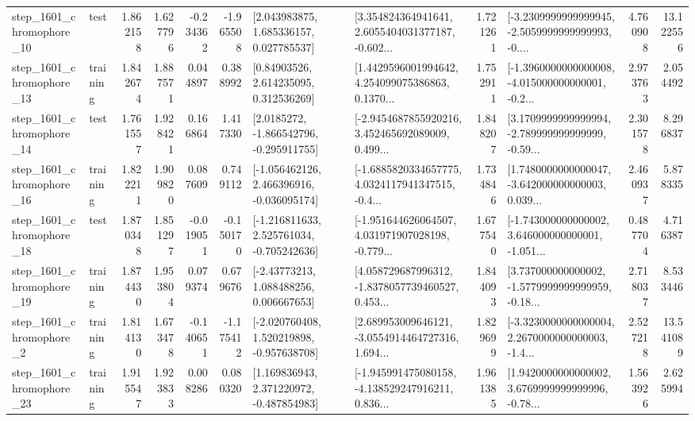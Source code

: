 \begin{tabular}{llrrrrllrlrr}
 step\_1601\_chromophore\_10 &      test &      1.862158 &    1.627796 &     -0.234362 & -1.965508 &     [2.043983875, 1.685336157, 0.027785537] &  [3.354824364941641, 2.6055404031377187, -0.602... &       1.721261 &  [-3.2309999999999945, -2.5059999999999993, -0.... &            4.760908 &         13.122556 \\
 step\_1601\_chromophore\_13 &  training &      1.842674 &    1.887571 &      0.044897 &  0.388992 &      [0.84903526, 2.614235095, 0.312536269] &  [1.4429596001994642, 4.254099075386863, 0.1370... &       1.752911 &  [-1.3960000000000008, -4.015000000000001, -0.2... &            2.973763 &          2.054492 \\
 step\_1601\_chromophore\_14 &      test &      1.761557 &    1.928421 &      0.166864 &  1.417330 &     [2.0185272, -1.866542796, -0.295911755] &  [-2.9454687855920216, 3.452465692089009, 0.499... &       1.848207 &  [3.1709999999999994, -2.789999999999999, -0.59... &            2.301578 &          8.296837 \\
 step\_1601\_chromophore\_16 &  training &      1.822211 &    1.909820 &      0.087609 &  0.749112 &   [-1.056462126, 2.466396916, -0.036095174] &  [-1.6885820334657775, 4.0324117941347515, -0.4... &       1.734846 &  [1.7480000000000047, -3.642000000000003, 0.039... &            2.460937 &          5.878335 \\
 step\_1601\_chromophore\_18 &      test &      1.870348 &    1.851297 &     -0.019051 & -0.150170 &   [-1.216811633, 2.525761034, -0.705242636] &  [-1.951644626064507, 4.031971907028198, -0.779... &       1.677540 &  [-1.743000000000002, 3.646000000000001, -1.051... &            0.487704 &          4.716387 \\
 step\_1601\_chromophore\_19 &  training &      1.874430 &    1.953804 &      0.079374 &  0.679676 &     [-2.43773213, 1.088488256, 0.006667653] &  [4.058729687996312, -1.8378057739460527, 0.453... &       1.844093 &  [3.737000000000002, -1.5779999999999959, -0.18... &            2.718037 &          8.533446 \\
  step\_1601\_chromophore\_2 &  training &      1.814130 &    1.673478 &     -0.140651 & -1.175412 &   [-2.020760408, 1.520219898, -0.957638708] &  [2.689953009646121, -3.0554914464727316, 1.694... &       1.829699 &  [-3.3230000000000004, 2.2670000000000003, -1.4... &            2.527218 &         13.541089 \\
 step\_1601\_chromophore\_23 &  training &      1.915547 &    1.923833 &      0.008286 &  0.080320 &    [1.169836943, 2.371220972, -0.487854983] &  [-1.945991475080158, -4.138529247916211, 0.836... &       1.961385 &  [1.9420000000000002, 3.6769999999999996, -0.78... &            1.563926 &          2.625994 \\

\end{tabular}
